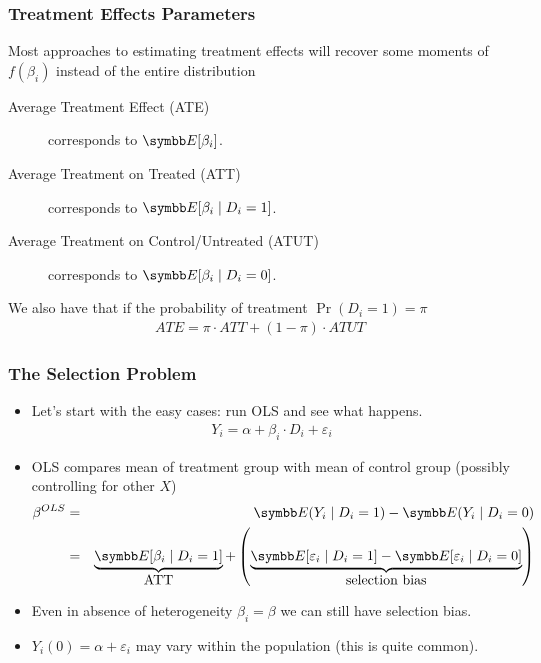 \documentclass[aspectratio=169,11pt]{beamer}
\begin{document}
\begin{frame}
\frametitle{Treatment Effects Parameters}
Most approaches to estimating treatment effects will recover some moments of $f(\beta_i)$ instead of the entire distribution
\begin{description}
\item[Average Treatment Effect (ATE)] corresponds to $\E[\beta_i]$.
\item[Average Treatment on Treated (ATT)] corresponds to $\E[\beta_i \mid D_i = 1]$.
\item[Average Treatment on Control/Untreated (ATUT)] corresponds to $\E[\beta_i \mid D_i = 0]$.
\end{description}
We also have that if the probability of treatment $\Pr(D_i=1) = \pi$
\begin{align*}
ATE = \pi \cdot ATT + (1-\pi) \cdot ATUT
\end{align*}
\end{frame}


\begin{frame}
\frametitle{The Selection Problem}
\begin{itemize}
\item Let's start with the easy cases: run OLS and see what happens.
\begin{align*}
Y_i = \alpha + \beta_i \cdot D_i + \varepsilon_i
\end{align*}
\item OLS compares mean of treatment group with mean of control group (possibly controlling for other $X$)
\begin{eqnarray*}
\beta^{OLS} &=& \E(Y_i \mid D_i =1) - \E(Y_i \mid D_i=0) \\
&=& \underbrace{\E[\beta_i \mid  D_i =1]}_{\mbox{ATT}} + \left(\underbrace{\E[\varepsilon_i \mid D_i =1 ] - \E[\varepsilon_i \mid D_i=0] }_{\mbox{selection bias}}  \right)
\end{eqnarray*}
\item Even in absence of heterogeneity $\beta_i = \beta$ we can still have selection bias. 
\item $Y_i(0) = \alpha + \varepsilon_i$ may vary within the population (this is quite common).
\end{itemize}
\end{frame}
\end{document}
